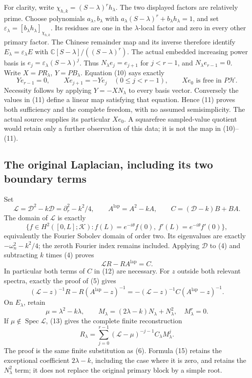 For clarity, write \(\chi_{h,k}=(S-\lambda)^r h_\lambda\).
The two displayed factors are relatively prime. Choose polynomials
\(a_\lambda,b_\lambda\) with
\(a_\lambda(S-\lambda)^r+b_\lambda h_\lambda=1\), and set
\(\varepsilon_\lambda=[b_\lambda h_\lambda]_{\chi_{h,k}}\).
Its residues are one in the \(\lambda\)-local factor and zero in
every other primary factor. The Chinese remainder map and its
inverse therefore identify \(E_\lambda=\varepsilon_\lambda E\)
with \(\mathbb C[S-\lambda]/((S-\lambda)^r)\).
The actual embedded increasing power basis is
\(e_j=\varepsilon_\lambda(S-\lambda)^j\). Thus
\(N_\lambda e_j=e_{j+1}\) for \(j<r-1\), and
\(N_\lambda e_{r-1}=0\). Write \(X=PR_\lambda\),
\(Y=PB_\lambda\). Equation (10) says exactly
\[
 Ye_{r-1}=0,\qquad
 Xe_{j+1}=-Ye_j\quad(0\le j<r-1),\qquad
 Xe_0\text{ is free in }P\mathscr H.
 \tag{11}
\]
Necessity follows by applying \(Y=-XN_\lambda\) to every basis
vector. Conversely the values in (11) define a linear map satisfying
that equation. Hence (11) proves both sufficiency and the complete
freedom, with no assumed semisimplicity. The actual source supplies
its particular \(Xe_0\). A squarefree sampled-value quotient would
retain only a further observation of this data; it is not the map
in (10)--(11).

\subsection{The original Laplacian, including its two boundary terms}
Set
\[
 \mathscr L=\mathscr D^2-k\mathscr D
 =\partial_r^2-k^2/4,
 \qquad A^{\mathrm{lap}}=A^2-kA,
 \qquad C=(\mathscr D-k)B+BA.
 \tag{12}
\]
The domain of \(\mathscr L\) is exactly
\[
 \{f\in H^2([0,L];\mathcal K):
 f(L)=e^{-i\theta}f(0),\ f'(L)=e^{-i\theta}f'(0)\},
\]
equivalently the Fourier Sobolev domain of order two.
Its eigenvalues are exactly \(-\omega_n^2-k^2/4\); the zeroth
Fourier index remains included. Applying \(\mathscr D\) to (4)
and subtracting \(k\) times (4) proves
\[
 \mathscr L R-RA^{\mathrm{lap}}=C.
 \tag{13}
\]
In particular both terms of \(C\) in (12) are necessary.
For \(z\) outside both relevant spectra, exactly the proof of (5)
gives
\[
 (\mathscr L-z)^{-1}R-R(A^{\mathrm{lap}}-z)^{-1}
 =-(\mathscr L-z)^{-1}C(A^{\mathrm{lap}}-z)^{-1}.
 \tag{14}
\]
On \(E_\lambda\), retain
\[
 \mu=\lambda^2-k\lambda,\qquad
 M_\lambda=(2\lambda-k)N_\lambda+N_\lambda^2,
 \quad M_\lambda^r=0.
 \tag{15}
\]
If \(\mu\notin\operatorname{Spec}\mathscr L\), (13) gives the
complete finite reconstruction
\[
 R_\lambda=\sum_{j=0}^{r-1}
       (\mathscr L-\mu)^{-j-1}C_\lambda M_\lambda^j.
 \tag{16}
\]
The proof is the same finite substitution as (6). Formula (15)
retains the exceptional coefficient \(2\lambda-k\), including
the case where it is zero, and retains the \(N_\lambda^2\) term;
it does not replace the original primary block by a simple root.

